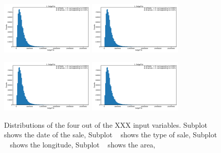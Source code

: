 \documentclass[a4paper, twoside, nobib]{tufte-book}
\begin{document}
\begin{figure}[htb]
  \centering
  
  \vspace*{-\abovecaptionskip}
  
  \subfloat[\label{fig:h:variable_overview_a}]{\qquad}
  \includegraphics[width=0.4\textwidth, page=2]{figures/housing/overview_fig.pdf}\hfil
  \subfloat[\label{fig:h:variable_overview_b}]{\qquad}
  \includegraphics[width=0.4\textwidth, page=6]{figures/housing/overview_fig.pdf}

  \subfloat[\label{fig:h:variable_overview_c}]{\qquad}
  \includegraphics[width=0.4\textwidth, page=20]{figures/housing/overview_fig.pdf}\hfil
  \subfloat[\label{fig:h:variable_overview_d}]{\qquad}
  \includegraphics[width=0.4\textwidth, page=23]{figures/housing/overview_fig.pdf}
  
  \caption[Input paramater distributions for the housing prices dataset]{Distributions of the four out of the XXX input variables. Subplot ~\protect{} shows the date of the sale, 
           Subplot ~\protect{} shows the type of sale,
           Subplot ~\protect{} shows the longitude,
           Subplot ~\protect{} shows the area,}
  \label{fig:h:variable_overview}
  
  \vspace{\abovecaptionskip}
\end{figure}
\end{document}

